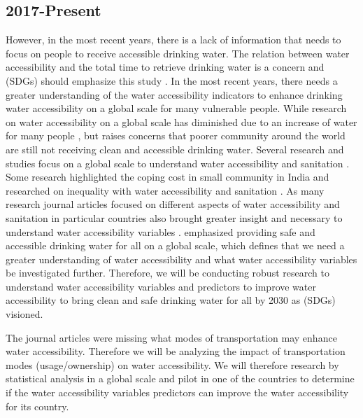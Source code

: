 \documentclass[10pt,twoside]{article}
\numberwithin{equation}{section}
\newcommand{\?}{\stackrel{?}{=}}
\begin{document}
\subsection{2017-Present}
However, in the most recent years, there is a lack of information that needs to focus on people to receive accessible drinking water. The relation between water accessibility and the total time to retrieve drinking water is a concern and (SDGs) should emphasize this study \citep{cassiviAccessDrinkingWater2018}. In the most recent years, there needs a greater understanding of the water accessibility indicators to enhance drinking water accessibility on a global scale for many vulnerable people. While research on water accessibility on a global scale has diminished due to an increase of water for many people \citep{fullerTrackingProgressGlobal2016}, but \citet{deshpandeMappingGeographicalInequalities2020} raises concerns that poorer community around the world are still not receiving clean and accessible drinking water. Several research and studies focus on a global scale to understand water accessibility and sanitation \citep{cassiviAccessDrinkingWater2018, tortajadaAchievingUniversalAccess2018, priceDifferenceDayCan2019,deshpandeMappingGeographicalInequalities2020}. Some research highlighted the coping cost in small community in India \citep{amitMeasuringAffordabilityAccess2019} and researched on inequality with water accessibility and sanitation \citet{amitMeasuringAffordabilityAccess2019,priceDifferenceDayCan2019, rawasComparingUtilityreportedHours2020}. As many research journal articles focused on different aspects of water accessibility and sanitation in particular countries also brought greater insight and necessary to understand water accessibility variables \citep{rawasComparingUtilityreportedHours2020, cassiviEvaluatingSelfreportedMeasures2021}. \citet{GoalCleanWater} emphasized providing safe and accessible drinking water for all on a global scale, which defines that we need a greater understanding of water accessibility and what water accessibility variables be investigated further. Therefore, we will be conducting robust research to understand water accessibility variables and predictors to improve water accessibility to bring clean and safe drinking water for all by 2030 as (SDGs) visioned. 

The journal articles were missing what modes of transportation may enhance water accessibility. Therefore we will be analyzing the impact of transportation modes (usage/ownership) on water accessibility. We will therefore research by statistical analysis in a global scale and pilot in one of the countries to determine if the water accessibility variables predictors can improve the water accessibility for its country.
\end{document}
